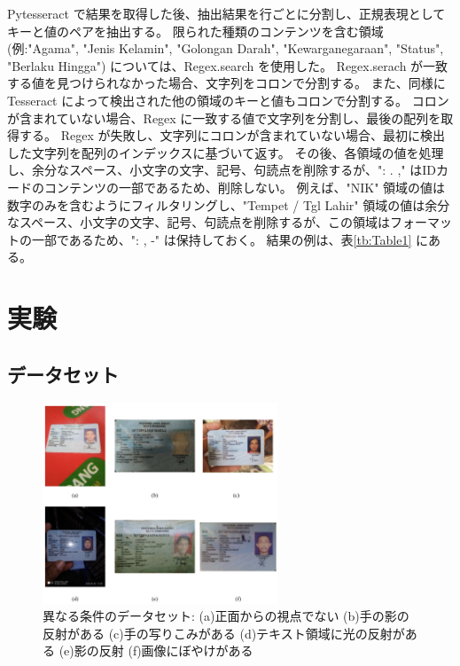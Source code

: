 \documentclass[uplatex, twocolumn,10pt]{jsarticle}
\begin{document}
Pytesseract で結果を取得した後、抽出結果を行ごとに分割し、正規表現としてキーと値のペアを抽出する。
限られた種類のコンテンツを含む領域(例:"Agama", "Jenis Kelamin", "Golongan Darah", "Kewarganegaraan", "Status", "Berlaku Hingga") については、Regex.search を使用した。
Regex.serach が一致する値を見つけられなかった場合、文字列をコロンで分割する。
また、同様に Tesseract によって検出された他の領域のキーと値もコロンで分割する。
コロンが含まれていない場合、Regex に一致する値で文字列を分割し、最後の配列を取得する。
Regex が失敗し、文字列にコロンが含まれていない場合、最初に検出した文字列を配列のインデックスに基づいて返す。
その後、各領域の値を処理し、余分なスペース、小文字の文字、記号、句読点を削除するが、": . ," はIDカードのコンテンツの一部であるため、削除しない。
例えば、"NIK" 領域の値は数字のみを含むようにフィルタリングし、"Tempet / Tgl Lahir" 領域の値は余分なスペース、小文字の文字、記号、句読点を削除するが、この領域はフォーマットの一部であるため、": , -" は保持しておく。
結果の例は、表\ref{tb:Table1} にある。



\section{実験}\label{sec:Experiment}


\subsection{データセット}

\begin{figure}[t]
    \begin{center}
        \includegraphics*[width=7cm]{image/Figure4.png}
        \caption{異なる条件のデータセット: (a)正面からの視点でない (b)手の影の反射がある (c)手の写りこみがある (d)テキスト領域に光の反射がある (e)影の反射 (f)画像にぼやけがある}
        \label{fig:Figure4}
    \end{center}
\end{figure}
\end{document}
